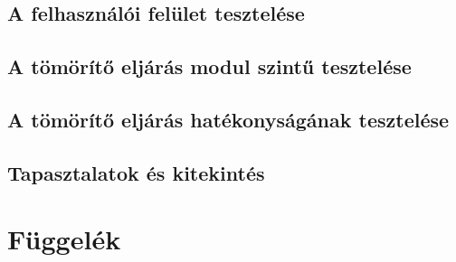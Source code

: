 \documentclass[oneside,titlepage,12pt,a4paper]{report}
\begin{document}
\section{A felhasználói felület tesztelése}

\section{A tömörítő eljárás modul szintű tesztelése}

\section{A tömörítő eljárás hatékonyságának tesztelése}

\section{Tapasztalatok és kitekintés}

\chapter{Függelék}
\end{document}
